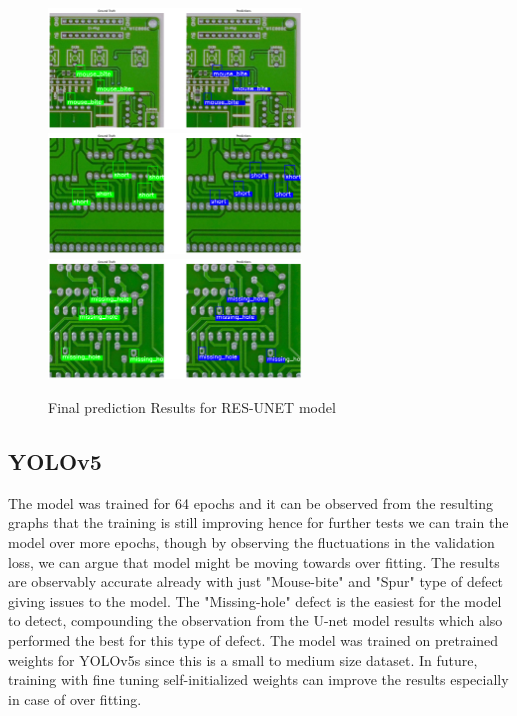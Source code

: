 \documentclass[12pt]{article}
\begin{document}
\begin{figure}[h]
    \centering
    \includegraphics[width=0.6\textwidth]{./graphics/results1_resunet.png}
    \includegraphics[width=0.6\textwidth]{./graphics/results2_resunet.png}
    \includegraphics[width=0.6\textwidth]{./graphics/results3_resunet.png}

    \caption{Final prediction Results for RES-UNET model}
    \label{fig:finalpred1_unet}
\end{figure}

\clearpage
\newpage

\subsection{YOLOv5}
The model was trained for 64 epochs and it can be observed from the resulting graphs that the training is still improving hence for further tests we can train the model over more epochs, though by observing the fluctuations in the validation loss, we can argue that model might be moving towards over fitting. The results are observably accurate already with just "Mouse-bite" and "Spur" type of defect giving issues to the model. The "Missing-hole" defect is the easiest for the model to detect, compounding the observation from the U-net model results which also performed the best for this type of defect.
The model was trained on pretrained weights for YOLOv5s since this is a small to medium size dataset. In future, training with fine tuning self-initialized weights can improve the results especially in case of over fitting.
\end{document}
